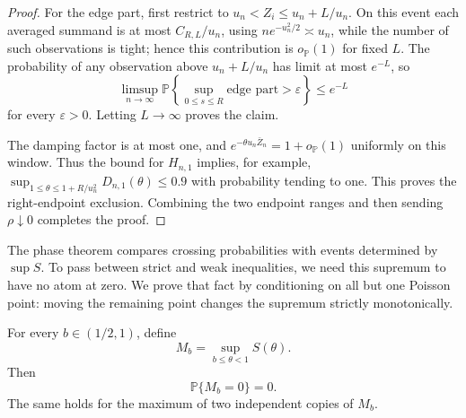 \begin{proof}
For the edge part, first restrict to $u_n<Z_i\le u_n+L/u_n$. On this event each averaged summand is at most $C_{R,L}/u_n$, using $n e^{-u_n^2/2}\asymp u_n$, while the number of such observations is tight; hence this contribution is $o_{\mathbb P}(1)$ for fixed $L$. The probability of any observation above $u_n+L/u_n$ has limit at most $e^{-L}$, so
\[
    \limsup_{n\to\infty}
    \mathbb P\left\{
        \sup_{0\le s\le R}
        \text{edge part}>\varepsilon
    \right\}
    \le
    e^{-L}
\]
for every $\varepsilon>0$. Letting $L\to\infty$ proves the claim.

The damping factor is at most one, and
$e^{-\theta u_n\bar Z_n}=1+o_{\mathbb P}(1)$ uniformly on this window.
Thus the bound for $H_{n,1}$ implies, for example,
$\sup_{1\le\theta\le1+R/u_n^2}D_{n,1}(\theta)\le0.9$ with probability
tending to one. This proves the right-endpoint exclusion. Combining the two
endpoint ranges and then sending $\rho\downarrow0$ completes the proof.
\end{proof}

The phase theorem compares crossing probabilities with events determined by
\(\sup S\). To pass between strict and weak inequalities, we need this
supremum to have no atom at zero. We prove that fact by conditioning on all
but one Poisson point: moving the remaining point changes the supremum
strictly monotonically.

\begin{lemma}
\label{lem:poisson-sup-no-atom}
For every $b\in(1/2,1)$, define
\[
    M_b=\sup_{b\le\theta<1}S(\theta).
\]
Then
\[
    \mathbb P\{M_b=0\}=0.
\]
The same holds for the maximum of two independent copies of $M_b$.
\end{lemma}

